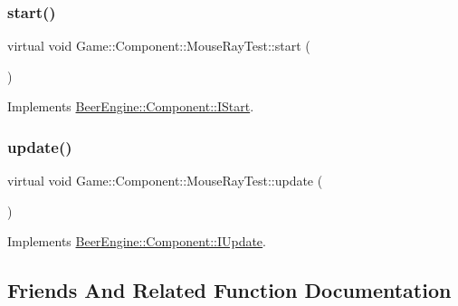 \subsubsection{\texorpdfstring{start()}{start()}}
{\footnotesize\ttfamily virtual void Game\+::\+Component\+::\+Mouse\+Ray\+Test\+::start (\begin{DoxyParamCaption}{ }\end{DoxyParamCaption})\hspace{0.3cm}{\ttfamily [virtual]}}



Implements \mbox{\hyperlink{class_beer_engine_1_1_component_1_1_i_start_aa3e25e86e20c46cdaefc6f6d7f21e495}{Beer\+Engine\+::\+Component\+::\+I\+Start}}.

\mbox{\label{class_game_1_1_component_1_1_mouse_ray_test_af5bf853e25dd4e70386dfecd4dc7dab9}} 
\subsubsection{\texorpdfstring{update()}{update()}}
{\footnotesize\ttfamily virtual void Game\+::\+Component\+::\+Mouse\+Ray\+Test\+::update (\begin{DoxyParamCaption}{ }\end{DoxyParamCaption})\hspace{0.3cm}{\ttfamily [virtual]}}



Implements \mbox{\hyperlink{class_beer_engine_1_1_component_1_1_i_update_aeeda0aa303175720e449b4c51d9867dd}{Beer\+Engine\+::\+Component\+::\+I\+Update}}.



\subsection{Friends And Related Function Documentation}
\mbox{\label{class_game_1_1_component_1_1_mouse_ray_test_a779a38a659ea997f8f091bc720620380}} 
